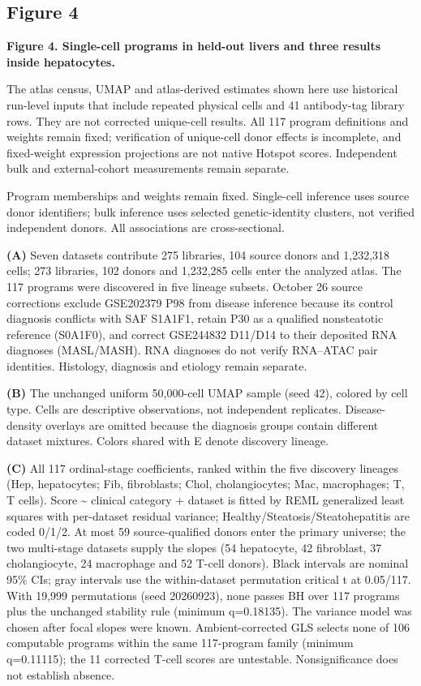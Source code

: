 \subsection{Figure 4}\label{figure-4}

\textbf{Figure 4. Single-cell programs in held-out livers and three results inside hepatocytes.}

The atlas census, UMAP and atlas-derived estimates shown here use historical
run-level inputs that include repeated physical cells and 41 antibody-tag
library rows. They are not corrected unique-cell results. All 117 program
definitions and weights remain fixed; verification of unique-cell donor effects
is incomplete, and fixed-weight expression projections are not native Hotspot
scores. Independent bulk and external-cohort measurements remain separate.

Program memberships and weights remain fixed. Single-cell inference uses source donor identifiers; bulk inference uses selected genetic-identity clusters, not verified independent donors. All associations are cross-sectional.

\textbf{(A)} Seven datasets contribute 275 libraries, 104 source donors and 1,232,318 cells; 273 libraries, 102 donors and 1,232,285 cells enter the analyzed atlas. The 117 programs were discovered in five lineage subsets. October 26 source corrections exclude GSE202379 P98 from disease inference because its control diagnosis conflicts with SAF S1A1F1, retain P30 as a qualified nonsteatotic reference (S0A1F0), and correct GSE244832 D11/D14 to their deposited RNA diagnoses (MASL/MASH). RNA diagnoses do not verify RNA--ATAC pair identities. Histology, diagnosis and etiology remain separate.

\textbf{(B)} The unchanged uniform 50,000-cell UMAP sample (seed 42), colored by cell type. Cells are descriptive observations, not independent replicates. Disease-density overlays are omitted because the diagnosis groups contain different dataset mixtures. Colors shared with E denote discovery lineage.

\textbf{(C)} All 117 ordinal-stage coefficients, ranked within the five discovery lineages (Hep, hepatocytes; Fib, fibroblasts; Chol, cholangiocytes; Mac, macrophages; T, T cells). Score \textasciitilde{} clinical category + dataset is fitted by REML generalized least squares with per-dataset residual variance; Healthy/Steatosis/Steatohepatitis are coded 0/1/2. At most 59 source-qualified donors enter the primary universe; the two multi-stage datasets supply the slopes (54 hepatocyte, 42 fibroblast, 37 cholangiocyte, 24 macrophage and 52 T-cell donors). Black intervals are nominal 95\% CIs; gray intervals use the within-dataset permutation critical \textbar t\textbar{} at 0.05/117. With 19,999 permutations (seed 20260923), none passes BH over 117 programs plus the unchanged stability rule (minimum q=0.18135). The variance model was chosen after focal slopes were known. Ambient-corrected GLS selects none of 106 computable programs within the same 117-program family (minimum q=0.11115); the 11 corrected T-cell scores are untestable. Nonsignificance does not establish absence.

